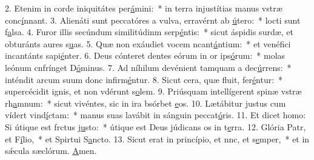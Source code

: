 2. Etenim in corde iniquitátes per\uline{á}mini:~* in terra injustítias manus vstræ conc\uline{í}nnant.
3. Alienáti sunt peccatóres a vulva, erravérnt ab \uline{ú}tero:~* locti sunt f\uline{a}lsa.
4. Furor illis secúndum similitúdinm serp\uline{é}ntis:~* sicut áspidis surdæ, et obturánts aures s\uline{u}as.
5. Quæ non exáudiet vocem ncant\uline{á}ntium:~* et venéfici incantánts sapi\uline{é}nter.
6. Deus cónteret dentes eórum in or ips\uline{ó}rum:~* molas leónum cnfrínget D\uline{ó}minus.
7. Ad níhilum devénient tamquam a dec\uline{ú}rrens:~* inténdit arcum suum donc infirm\uline{é}ntur.
8. Sicut cera, quæ fluit, fer\uline{é}ntur:~* supercécidit ignis, et non vdérunt s\uline{o}lem.
9. Priúsquam intellígerent spinæ vstræ rh\uline{a}mnum:~* sicut vivéntes, sic in ira bsórbet \uline{e}os.
10. Lætábitur justus cum vídert vind\uline{í}ctam:~* manus suas lavábit in sánguin peccat\uline{ó}ris.
11. Et dicet homo: Si útique est frctus j\uline{u}sto:~* útique est Deus júdicans os in t\uline{e}rra.
12. Glória Patr, et F\uline{í}lio,~* et Spirtui S\uline{a}ncto.
13. Sicut erat in princípio, et nnc, et s\uline{e}mper,~* et in sǽcula sæclórum. \uline{A}men.
